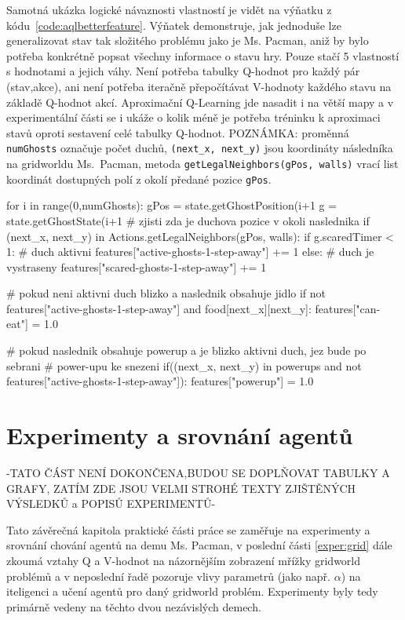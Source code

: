Samotná ukázka logické návaznosti vlastností je vidět na výňatku z kódu~\ref{code:aqlbetterfeature}. Výňatek demonstruje, jak jednoduše lze generalizovat stav tak složitého problému jako je Ms. Pacman, aniž by bylo potřeba konkrétně popsat všechny informace o stavu hry. Pouze stačí 5 vlastností s hodnotami a jejich váhy. Není potřeba tabulky Q-hodnot pro každý pár (stav,akce), ani není potřeba iteračně přepočítávat V-hodnoty každého stavu na základě Q-hodnot akcí. Aproximační Q-Learning jde nasadit i na větší mapy a v experimentální části se i ukáže o kolik méně je potřeba tréninku k aproximaci stavů oproti sestavení celé tabulky Q-hodnot. \newline POZNÁMKA: proměnná \texttt{numGhosts} označuje počet duchů, \texttt{(next\_x, next\_y)} jsou koordináty následníka na gridworldu Ms.~Pacman, metoda \texttt{getLegalNeighbors(gPos, walls)} vrací list koordinát dostupných polí z okolí předané pozice \texttt{gPos}.
\begin{python}[label={code:aqlbetterfeature}]
for i in range(0,numGhosts):
   gPos = state.getGhostPosition(i+1%
   g = state.getGhostState(i+1%
   # zjisti zda je duchova pozice v okoli naslednika
   if (next_x, next_y) in Actions.getLegalNeighbors(gPos, walls):
      if g.scaredTimer < 1:   # duch aktivni
         features["active-ghosts-1-step-away"] += 1
      else:                   # duch je vystraseny
         features["scared-ghosts-1-step-away"] += 1

# pokud neni aktivni duch blizko a naslednik obsahuje jidlo
if not features["active-ghosts-1-step-away"] and food[next_x][next_y]:
   features["can-eat"] = 1.0

# pokud naslednik obsahuje powerup a je blizko aktivni duch, jez bude po sebrani
# power-upu ke snezeni
if((next_x, next_y) in powerups and not 
features["active-ghosts-1-step-away"]):
    features["powerup"] = 1.0
\end{python}

\chapter{Experimenty a srovnání agentů}
\label{exper}
-TATO ČÁST NENÍ DOKONČENA,BUDOU SE DOPLŇOVAT TABULKY A GRAFY, ZATÍM ZDE JSOU VELMI STROHÉ TEXTY ZJIŠTĚNÝCH VÝSLEDKŮ a POPISŮ EXPERIMENTŮ-


Tato závěrečná kapitola praktické části práce se zaměřuje na experimenty a srovnání chování agentů na demu Ms. Pacman, v poslední části \ref{exper:grid} dále zkoumá vztahy Q a V-hodnot na názornějším zobrazení mřížky gridworld problémů a v neposlední řadě pozoruje vlivy parametrů (jako např. $\alpha$) na iteligenci a učení agentů pro daný gridworld problém. Experimenty byly tedy primárně vedeny na těchto dvou nezávislých demech.

